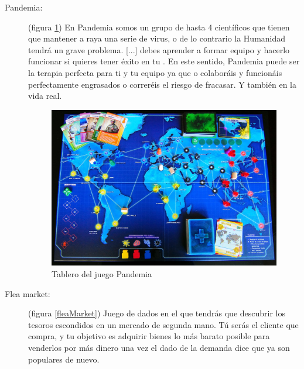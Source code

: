 \begin{description}
\item[Pandemia: ] (figura \ref{pandemia}) En Pandemia somos un grupo de hasta 4 científicos que tienen que mantener a raya una serie de virus, o de lo contrario la Humanidad tendrá un grave problema. [...] debes aprender a formar equipo y hacerlo funcionar si quieres tener éxito en tu . En este sentido, Pandemia puede ser la terapia perfecta para ti y tu equipo ya que o colaboráis y funcionáis perfectamente engrasados o correréis el riesgo de fracasar. Y también en la vida real. \cite{faceentrepreneurship2016}

\begin{figure}
\begin{center}
\includegraphics[scale=0.25]{imagenes/pandemia.jpg}
\caption{Tablero del juego Pandemia}
\label{pandemia}
\end{center}
\end{figure}

\item[Flea market:] (figura \ref{fleaMarket}) Juego de dados en el que tendrás que descubrir los tesoros escondidos en un mercado de segunda mano. Tú serás el cliente que compra, y tu objetivo es adquirir bienes lo más barato posible para venderlos por más dinero una vez el dado de la demanda dice que ya son populares de nuevo. \cite{mariagonzalez2015}


\end{description}
